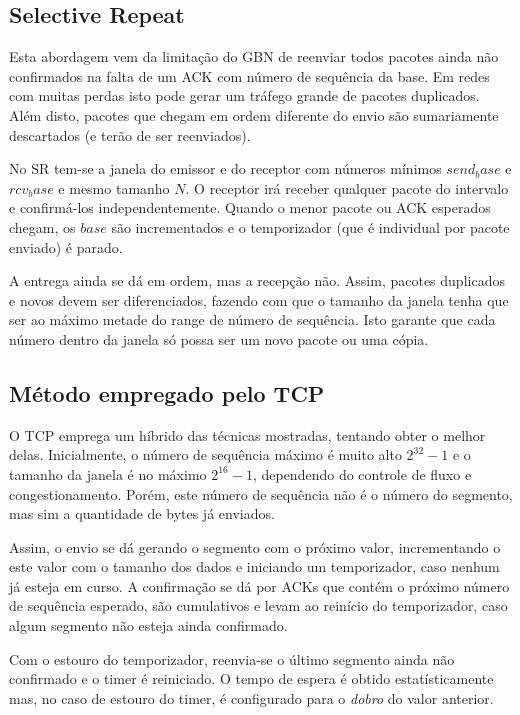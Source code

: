 \subsection{Selective Repeat}

Esta abordagem vem da limitação do GBN de reenviar todos pacotes ainda não confirmados na falta de um ACK com número de sequência da base.
Em redes com muitas perdas isto pode gerar um tráfego grande de pacotes duplicados. 
Além disto, pacotes que chegam em ordem diferente do envio são sumariamente descartados (e terão de ser reenviados).

No SR tem-se a janela do emissor e do receptor com números mínimos $send_base$ e $rcv_base$ e mesmo tamanho $N$.
O receptor irá receber qualquer pacote do intervalo e confirmá-los independentemente.
Quando o menor pacote ou ACK esperados chegam, os $base$ são incrementados e o temporizador (que é individual por pacote enviado) é parado.

A entrega ainda se dá em ordem, mas a recepção não. 
Assim, pacotes duplicados e novos devem ser diferenciados, fazendo com que o tamanho da janela tenha que ser ao máximo metade do range de número de sequência.
Isto garante que cada número dentro da janela só possa ser um novo pacote ou uma cópia.

\subsection{Método empregado pelo TCP}

O TCP emprega um híbrido das técnicas mostradas, tentando obter o melhor delas.
Inicialmente, o número de sequência máximo é muito alto $2^{32} -1$ e o tamanho da janela é no máximo $2^{16} -1$, dependendo do controle de fluxo e congestionamento.
Porém, este número de sequência não é o número do segmento, mas sim a quantidade de bytes já enviados.

Assim, o envio se dá gerando o segmento com o próximo valor, incrementando o este valor com o tamanho dos dados e iniciando um temporizador, 
caso nenhum já esteja em curso.
A confirmação se dá por ACKs que contém o próximo número de sequência esperado, são cumulativos e levam ao reinício do temporizador, caso algum segmento não esteja ainda confirmado.

Com o estouro do temporizador, reenvia-se o último segmento ainda não confirmado e o timer é reiniciado.
O tempo de espera é obtido estatísticamente mas, no caso de estouro do timer, é configurado para o \emph{dobro} do valor anterior.


